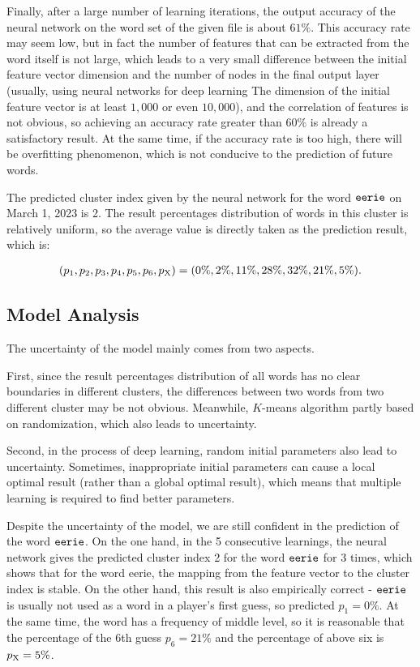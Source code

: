 
Finally, after a large number of learning iterations, the output accuracy of the neural network on the word set of the given file is about $61\%$. This accuracy rate may seem low, but in fact the number of features that can be extracted from the word itself is not large, which leads to a very small difference between the initial feature vector dimension and the number of nodes in the final output layer (usually, using neural networks for deep learning The dimension of the initial feature vector is at least $1,000$ or even $10,000$), and the correlation of features is not obvious, so achieving an accuracy rate greater than $60\%$ is already a satisfactory result. At the same time, if the accuracy rate is too high, there will be overfitting phenomenon, which is not conducive to the prediction of future words.

The predicted cluster index given by the neural network for the word $\tt eerie$ on March 1, 2023 is 2. The result percentages distribution of words in this cluster is relatively uniform, so the average value is directly taken as the prediction result, which is:

\begin{equation}
	\begin{aligned}
		(p_1, p_2, p_3, p_4, p_5, p_6, p_{\rm X}) = (0\%, 2\%, 11\%, 28\%, 32\%, 21\%, 5\%).
	\end{aligned}
\end{equation}

\subsection{Model Analysis}

The uncertainty of the model mainly comes from two aspects. 

First, since the result percentages distribution of all words has no clear boundaries in different clusters, the differences between two words from two different cluster may be not obvious. Meanwhile, $K$-means algorithm partly based on randomization, which also leads to uncertainty. 

Second, in the process of deep learning, random initial parameters also lead to uncertainty. Sometimes, inappropriate initial parameters can cause a local optimal result (rather than a global optimal result), which means that multiple learning is required to find better parameters.

Despite the uncertainty of the model, we are still confident in the prediction of the word $\tt eerie$. On the one hand, in the 5 consecutive learnings, the neural network gives the predicted cluster index 2 for the word $\tt eerie$ for 3 times, which shows that for the word eerie, the mapping from the feature vector to the cluster index is stable. On the other hand, this result is also empirically correct - $\tt eerie$ is usually not used as a word in a player's first guess, so predicted $p_1 = 0\%$. At the same time, the word has a frequency of middle level, so it is reasonable that the percentage of the 6th guess $p_6 = 21\%$ and the percentage of above six is $p_{\rm X} = 5\%$.

